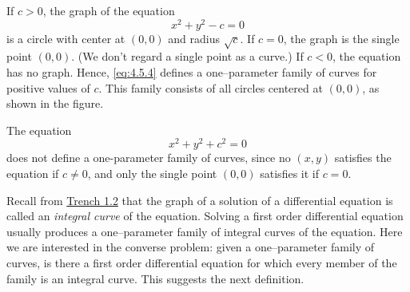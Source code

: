 \documentclass{ximera}
\begin{document}
 
 
\begin{example}\label{example:4.5.3}
If $c>0$,  the graph of the equation
\begin{equation} \label{eq:4.5.4}
x^2+y^2-c=0
\end{equation}
is a circle with center at $(0,0)$ and radius $\sqrt{c}$. If $c=0$, the
graph is the single point $(0,0)$. (We don't regard a single point as
a curve.) If $c<0$, the equation has no graph. Hence, \eqref{eq:4.5.4}
defines a one--parameter family of curves for positive values of $c$.
This family consists of all circles centered at $(0,0)$, as shown in the figure.

\begin{center}
\end{center}
 
 
\end{example}
 
\begin{example}\label{example:4.5.4}
 The equation
$$
x^2+y^2+c^2=0
$$
does not define a one-parameter family of curves, since no $(x,y)$
satisfies the equation if $c\neq 0$, and only the single point $(0,0)$
satisfies it if $c=0$.
\end{example}
 
Recall from \href{https://ximera.osu.edu/ode/main/basicConcepts/basicConcepts}{Trench 1.2} that the graph of a solution of a
differential equation is called an \textit{integral curve} of the
equation. Solving a first order differential equation usually produces
a one--parameter family of integral curves of the equation. Here we
are interested in the converse problem:
given a one--parameter family of curves, is there a first order
differential equation for which every  member of the family is an integral
curve.
This suggests the next definition.
 
\end{document}
